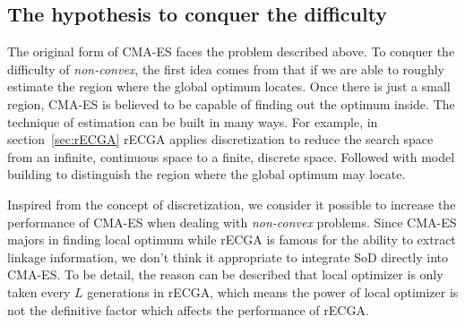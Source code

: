 \subsection{The hypothesis to conquer the
                    difficulty}

                    The original form of CMA-ES faces the problem
                    described above.  To conquer the difficulty of
                    \emph{non-convex}, the first idea comes from that if
                    we are able to roughly estimate the region where the
                    global optimum locates.  Once there is just a small
                    region, CMA-ES is believed to be capable of finding
                    out the optimum inside.  The technique of estimation
                    can be built in many ways.  For example, in
                    section~\ref{sec:rECGA} rECGA applies discretization
                    to reduce the search space from an infinite,
                    continuous space to a finite, discrete space.
                    Followed with model building to distinguish the
                    region where the global optimum may locate.

                    Inspired from the concept of discretization, we
                    consider it possible to increase the performance of
                    CMA-ES when dealing with \emph{non-convex} problems.
                    Since CMA-ES majors in finding local optimum while
                    rECGA is famous for the ability to extract linkage
                    information, we don't think it appropriate to
                    integrate SoD directly into CMA-ES.  To be detail,
                    the reason can be described that local optimizer is
                    only taken every $L$ generations in rECGA, which
                    means the power of local optimizer is not the
                    definitive factor which affects the performance of
                    rECGA.

